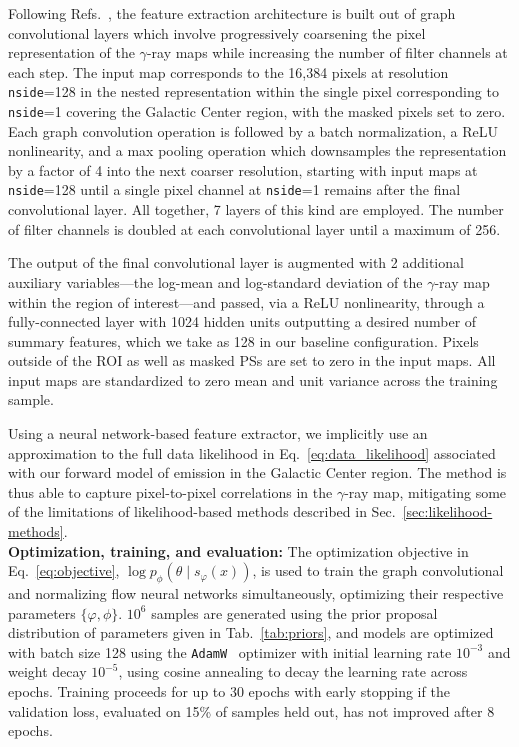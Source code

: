 \documentclass[prd,aps,10pt,nofootinbib,twocolumn,superscriptaddress,preprintnumbers,balancelastpage,longbibliography]{revtex4-1}
\begin{document}
Following Refs.~\cite{Perraudin:2018rbt,List:2020mzd}, the feature extraction architecture is built out of graph convolutional layers which involve progressively coarsening the pixel representation of the $\gamma$-ray maps while increasing the number of filter channels at each step. The input map corresponds to the 16,384 pixels at \HEALPix resolution \texttt{nside}=128 in the nested representation within the single pixel corresponding to \texttt{nside}=1 covering the Galactic Center region, with the masked pixels set to zero. Each graph convolution operation is followed by a batch normalization, a ReLU nonlinearity, and a max pooling operation which downsamples the representation by a factor of 4 into the next coarser \HEALPix resolution, starting with input maps at \texttt{nside}=128 until a single pixel channel at \texttt{nside}=1 remains after the final convolutional layer. All together, 7 layers of this kind are employed. The number of filter channels is doubled at each convolutional layer until a maximum of 256. 

The output of the final convolutional layer is augmented with 2 additional auxiliary variables---the log-mean and log-standard deviation of the $\gamma$-ray map within the region of interest---and passed, via a ReLU nonlinearity, through a fully-connected layer with 1024 hidden units outputting a desired number of summary features, which we take as 128 in our baseline configuration. Pixels outside of the ROI as well as masked PSs are set to zero in the input maps. All input maps are standardized to zero mean and unit variance across the training sample.

Using a neural network-based feature extractor, we implicitly use an approximation to the full data likelihood in Eq.~\eqref{eq:data_likelihood} associated with our forward model of emission in the Galactic Center region. The method is thus able to capture pixel-to-pixel correlations in the $\gamma$-ray map, mitigating some of the limitations of likelihood-based methods described in Sec.~\ref{sec:likelihood-methods}. \\

\noindent
\textbf{Optimization, training, and evaluation:} The optimization objective in Eq.~\eqref{eq:objective}, $\log p_\phi(\theta\mid s_\varphi(x))$, is used to train the graph convolutional and normalizing flow neural networks simultaneously, optimizing their respective parameters $\{\varphi, \phi\}$. $10^{6}$ samples are generated using the prior proposal distribution of parameters given in Tab.~\ref{tab:priors}, and models are optimized with batch size 128 using the \texttt{AdamW}~\cite{KingmaB14,loshchilov2018decoupled} optimizer with initial learning rate $10^{-3}$ and weight decay $10^{-5}$, using cosine annealing to decay the learning rate across epochs. Training proceeds for up to 30 epochs with early stopping if the validation loss, evaluated on 15\% of samples held out, has not improved after 8 epochs. 
\end{document}
